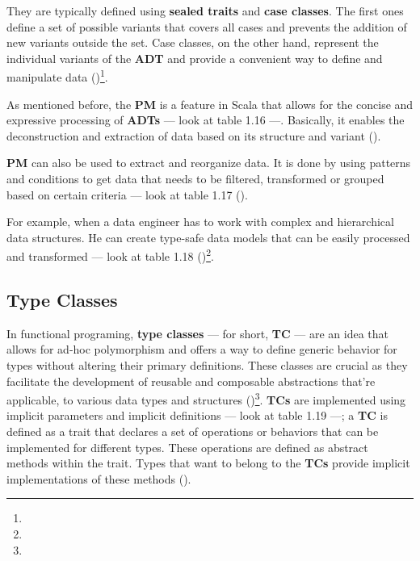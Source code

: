 They are typically defined using \textbf{sealed traits} and \textbf{case classes}. The first ones define a set of possible variants that covers all cases and prevents the addition of new variants outside the set. Case classes, on the other hand, represent the individual variants of the \textbf{ADT} and provide a convenient way to define and manipulate data (\cite{michael.etal_2023})\footnote[11]{}.



As mentioned before, the \textbf{PM} is a feature in Scala that allows for the concise and expressive processing of \textbf{ADTs} — look at table 1.16 —. Basically, it enables the deconstruction and extraction of data based on its structure and variant (\cite{michael.etal_2023})\footnotemark[11].



\textbf{PM} can also be used to extract and reorganize data. It is done by using patterns and conditions to get data that needs to be filtered, transformed or grouped based on certain criteria  — look at table 1.17 (\cite{michael.etal_2023})\footnotemark[11].



For example, when a data engineer has to work with complex and hierarchical data structures. He can create type-safe data models that can be easily processed and transformed — look at table 1.18 (\cite{michael.etal_2023})\footnote[11]{}.



\subsection{Type Classes}

In functional programing, \textbf{type classes} — for short, \textbf{TC} — are an idea that allows for ad-hoc polymorphism and offers a way to define generic behavior for types without altering their primary definitions. These classes are crucial as they facilitate the development of reusable and composable abstractions that're applicable, to various data types and structures (\cite{odersky.etal_2021})\footnote[2]{}. \textbf{TCs} are implemented using implicit parameters and implicit definitions — look at table 1.19 —; a \textbf{TC} is defined as a trait that declares a set of operations or behaviors that can be implemented for different types. These operations are defined as abstract methods within the trait. Types that want to belong to the \textbf{TCs} provide implicit implementations of these methods (\cite{odersky.etal_2021})\footnotemark[2].

